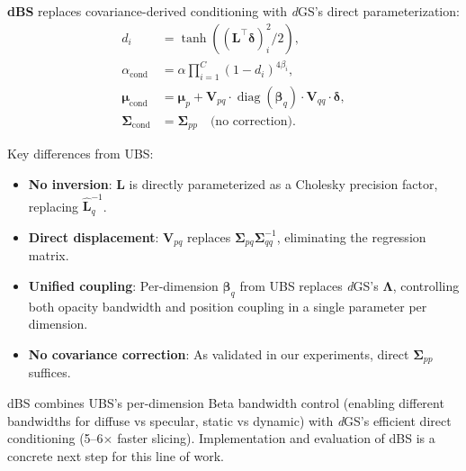 \documentclass{article}
\newcommand{\modelname}{\textit{d}GS}
\theoremstyle{plain}
\theoremstyle{definition}
\theoremstyle{remark}
\begin{document}
\textbf{dBS} replaces covariance-derived conditioning with \modelname{}'s direct parameterization:
\begin{align}
d_i &= \tanh\!\left((\mathbf{L}^\top \boldsymbol{\delta})_i^2 / 2\right), \\
\alpha_{\text{cond}} &= \alpha \prod_{i=1}^{C} (1 - d_i)^{4\beta_i}, \\
\boldsymbol{\mu}_{\text{cond}} &= \boldsymbol{\mu}_p + \mathbf{V}_{pq} \cdot \operatorname{diag}(\boldsymbol{\beta}_q) \cdot \mathbf{V}_{qq} \cdot \boldsymbol{\delta}, \\
\boldsymbol{\Sigma}_{\text{cond}} &= \boldsymbol{\Sigma}_{pp} \quad \text{(no correction)}.
\end{align}

Key differences from UBS:
\begin{itemize}[leftmargin=*]
\item \textbf{No inversion}: $\mathbf{L}$ is directly parameterized as a Cholesky precision factor, replacing $\hat{\mathbf{L}}_q^{-1}$.
\item \textbf{Direct displacement}: $\mathbf{V}_{pq}$ replaces $\boldsymbol{\Sigma}_{pq}\boldsymbol{\Sigma}_{qq}^{-1}$, eliminating the regression matrix.
\item \textbf{Unified coupling}: Per-dimension $\boldsymbol{\beta}_q$ from UBS replaces \modelname{}'s $\boldsymbol{\Lambda}$, controlling both opacity bandwidth and position coupling in a single parameter per dimension.
\item \textbf{No covariance correction}: As validated in our experiments, direct $\boldsymbol{\Sigma}_{pp}$ suffices.
\end{itemize}

dBS combines UBS's per-dimension Beta bandwidth control (enabling different bandwidths for diffuse vs specular, static vs dynamic) with \modelname{}'s efficient direct conditioning (5--6$\times$ faster slicing). Implementation and evaluation of dBS is a concrete next step for this line of work.
\end{document}
